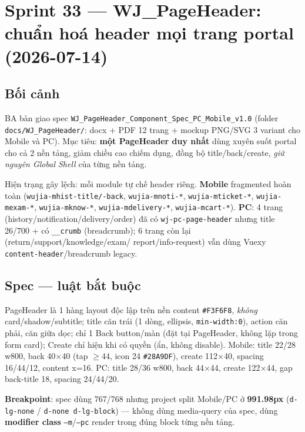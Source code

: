 \chapter{Sprint 33 --- WJ\_PageHeader: chuẩn hoá header mọi trang portal (2026-07-14)}

\section{Bối cảnh}

BA bàn giao spec \texttt{WJ\_PageHeader\_Component\_Spec\_PC\_Mobile\_v1.0} (folder
\texttt{docs/WJ\_PageHeader/}: docx + PDF 12 trang + mockup PNG/SVG 3 variant cho Mobile và PC).
Mục tiêu: \textbf{một PageHeader duy nhất} dùng xuyên suốt portal cho cả 2 nền tảng, giảm chiều cao
chiếm dụng, đồng bộ title/back/create, \emph{giữ nguyên Global Shell} của từng nền tảng.

Hiện trạng gây lệch: mỗi module tự chế header riêng. \textbf{Mobile} fragmented hoàn toàn
(\texttt{wujia-mhist-title/-back}, \texttt{wujia-mnoti-*}, \texttt{wujia-mticket-*},
\texttt{wujia-mexam-*}, \texttt{wujia-mknow-*}, \texttt{wujia-mdelivery-*}, \texttt{wujia-mcart-*}).
\textbf{PC}: 4 trang (history/notification/delivery/order) đã có \texttt{wj-pc-page-header} nhưng
title 26/700 + có \texttt{\_\_crumb} (breadcrumb); 6 trang còn lại (return/support/knowledge/exam/
report/info-request) vẫn dùng Vuexy \texttt{content-header}/breadcrumb legacy.

\section{Spec --- luật bắt buộc}

PageHeader là 1 hàng layout độc lập trên nền content \texttt{\#F3F6F8}, \emph{không} card/shadow/subtitle;
title căn trái (1 dòng, ellipsis, \texttt{min-width:0}), action căn phải, căn giữa dọc; chỉ 1 Back
button/màn (đặt tại PageHeader, không lặp trong form card); Create chỉ hiện khi có quyền (ẩn, không
disable). Mobile: title 22/28 w800, back 40$\times$40 (tap $\ge$44, icon 24 \texttt{\#28A9DF}), create
112$\times$40, spacing 16/44/12, content x=16. PC: title 28/36 w800, back 44$\times$44, create
122$\times$44, gap back-title 18, spacing 24/44/20.

\textbf{Breakpoint}: spec dùng 767/768 nhưng project split Mobile/PC ở \textbf{991.98px}
(\texttt{d-lg-none} / \texttt{d-none d-lg-block}) --- không dùng media-query của spec, dùng
\textbf{modifier class} \texttt{--m}/\texttt{--pc} render trong đúng block từng nền tảng.

